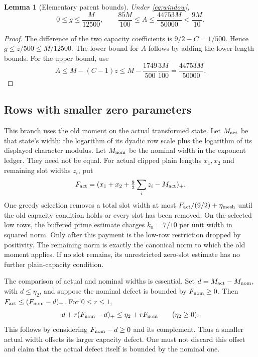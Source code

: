 \documentclass[11pt]{article}
\newtheorem{lemma}[proposition]{Lemma}
\theoremstyle{definition}
\newcommand{\pos}[1]{(#1)_{+}}
\begin{document}
\begin{lemma}[Elementary parent bounds]\label{lem:parent}
Under \eqref{eq:window},
\[
 0\le g\le\frac M{12500},\qquad
 \frac{85M}{100}\le A\le\frac{44753M}{50000}<\frac{9M}{10}.
\]
\end{lemma}
\begin{proof}
The difference of the two capacity coefficients is
$9/2-C=1/500$. Hence $g\le z/500\le M/12500$.
The lower bound for $A$ follows by adding the lower length bounds.
For the upper bound, use
\[
 A\le M-(C-1)z
 \le M-\frac{1749}{500}\frac{3M}{100}
 =\frac{44753M}{50000}.
\]
\end{proof}

\subsection{Rows with smaller zero parameters}
This branch uses the old moment on the actual transformed state. Let
$M_{\rm act}$ be that state's width: the logarithm of its dyadic row scale
plus the logarithm of its displayed character modulus. Let $M_{\rm nom}$
be the nominal width in the exponent ledger. They need not be equal.
For actual clipped plain lengths $x_1,x_2$ and remaining slot widths $z_i$,
put
\[
 F_{\rm act}=\pos{x_1+x_2+\tfrac92\sum_i z_i-M_{\rm act}}.
\]
One greedy selection removes a total slot width at most
$F_{\rm act}/(9/2)+\eta_{\rm mesh}$ until the old capacity condition holds
or every slot has been removed. On the selected low rows, the buffered
prime estimate charges $k_0=7/10$ per unit width in squared norm.
Only after this payment is the low-row restriction dropped by positivity.
The remaining norm is exactly the canonical norm to which the old
moment applies. If no slot remains, its unrestricted zero-slot estimate
has no further plain-capacity condition.

The comparison of actual and nominal widths is essential. Set
$d=M_{\rm act}-M_{\rm nom}$, with $d\le\eta_2$, and suppose the nominal
defect is bounded by $F_{\rm nom}\ge0$. Then
$F_{\rm act}\le\pos{F_{\rm nom}-d}$. For $0\le r\le1$,
\begin{equation}\label{eq:widthpayment}
 d+r\pos{F_{\rm nom}-d}\le\eta_2+rF_{\rm nom}
 \qquad(\eta_2\ge0).
\end{equation}
This follows by considering $F_{\rm nom}-d\ge0$ and its complement.
Thus a smaller actual width offsets its larger capacity defect. One must
not discard this offset and claim that the actual defect itself is bounded
by the nominal one.
\end{document}
